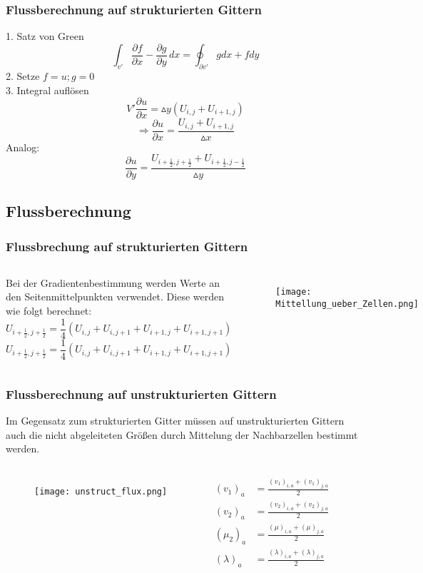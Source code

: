 \documentclass[
	11pt, %
	aspectratio=169, %
]{beamer}
\begin{document}
	
	\begin{frame}
		\frametitle{Flussberechnung auf strukturierten Gittern}
		1. Satz von Green
		$$\int_{v'} \frac{\partial f}{\partial x} - \frac{\partial g}{\partial y}\,dx =  \oint_{\partial v'} g dx + f dy$$
		2. Setze $f = u; g = 0$\\
		3. Integral auflösen
		$$V'\frac{\partial u}{\partial x} = \vartriangle y (U_{i,j} + U_{i+1,j})$$
		$$ \Rightarrow \frac{\partial u}{\partial x} = \frac{U_{i,j} + U_{i+1,j}}{\vartriangle  x}$$
		Analog:
		$$\frac{\partial u}{\partial y} = \frac{U_{i+\frac{1}{2},j+\frac{1}{2}}+ U_{i+\frac{1}{2},j-\frac{1}{2}}}{\vartriangle y}$$
		
	\end{frame}
	
	\subsection{Flussberechnung}
	
	
	\begin{frame}
		\frametitle{Flussbrechung auf strukturierten Gittern}
		\begin{columns}
			
			Bei der Gradientenbestimmung werden Werte an den Seitenmittelpunkten verwendet.
			Diese werden wie folgt berechnet:
			$$U_{i+\frac{1}{2}, j + \frac{1}{2}} = \frac{1}{4} (U_{i,j}+U_{i,j+1}+U_{i+1,j}+U_{i+1,j+1}) $$
			$$U_{i+\frac{1}{2}, j + \frac{1}{2}} = \frac{1}{4} (U_{i,j}+U_{i,j+1}+U_{i+1,j}+U_{i+1,j+1})$$
			
			\begin{figure}
				\texttt{[image: Mittellung\_ueber\_Zellen.png]}
			\end{figure}
		\end{columns}
	\end{frame}
	
	\begin{frame}
		\frametitle{Flussberechnung auf unstrukturierten Gittern}
		Im Gegensatz zum strukturierten Gitter müssen auf unstrukturierten Gittern auch die nicht abgeleiteten Größen
		durch Mittelung der Nachbarzellen bestimmt werden.
		\begin{columns}
			\column{0.45\textwidth}
			\begin{figure}
				\texttt{[image: unstruct\_flux.png]}
			\end{figure}
			
			
			\column{0.45\textwidth}
			\begin{align}
			(v_1)_a &= \frac{(v_1)_{i,a}+(v_1)_{j,a}}{2} \\
			(v_2)_a &= \frac{(v_2)_{i,a}+(v_2)_{j,a}}{2} \\
			(\mu_2)_a &= \frac{(\mu)_{i,a}+(\mu)_{j,a}}{2} \\
			(\lambda)_a &= \frac{(\lambda)_{i,a}+(\lambda)_{j,a}}{2}
			\end{align}
		\end{columns}
		
	\end{frame}	
	
\end{document}
